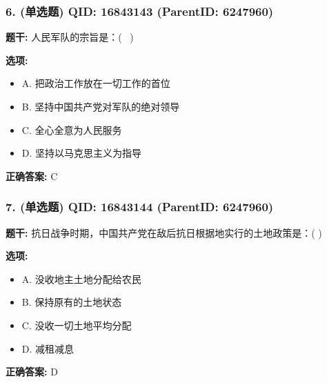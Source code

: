 \documentclass[12pt,UTF8]{ctexart}
\begin{document}
\subsubsection*{6. (单选题) \small QID: 16843143 (ParentID: 6247960)}

\textbf{题干:}
人民军队的宗旨是：(  )



\textbf{选项:}
\begin{itemize}[leftmargin=*]

  \item A. 把政治工作放在一切工作的首位

  \item B. 坚持中国共产党对军队的绝对领导

  \item C. 全心全意为人民服务

  \item D. 坚持以马克思主义为指导

\end{itemize}

\textbf{正确答案:}
C

\vspace{0.3em}\hrulefill\vspace{0.7em}

\subsubsection*{7. (单选题) \small QID: 16843144 (ParentID: 6247960)}

\textbf{题干:}
抗日战争时期，中国共产党在敌后抗日根据地实行的土地政策是：( )



\textbf{选项:}
\begin{itemize}[leftmargin=*]

  \item A. 没收地主土地分配给农民

  \item B. 保持原有的土地状态

  \item C. 没收一切土地平均分配

  \item D. 减租减息

\end{itemize}

\textbf{正确答案:}
D

\vspace{0.3em}\hrulefill\vspace{0.7em}
\end{document}
